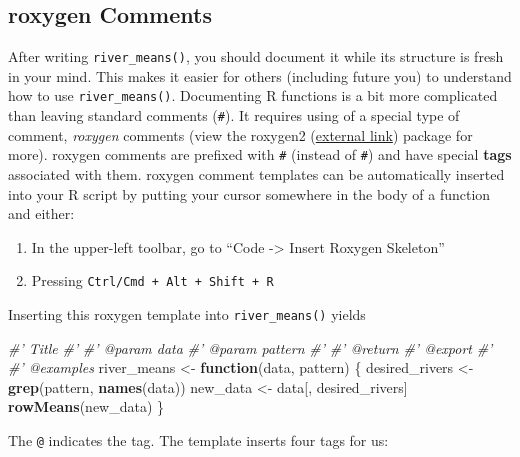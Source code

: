\documentclass[
]{book}
\newenvironment{Shaded}{\begin{snugshade}}{\end{snugshade}}
\newcommand{\CommentTok}[1]{\textcolor[rgb]{0.56,0.35,0.01}{\textit{#1}}}
\newcommand{\ControlFlowTok}[1]{\textcolor[rgb]{0.13,0.29,0.53}{\textbf{#1}}}
\newcommand{\KeywordTok}[1]{\textcolor[rgb]{0.13,0.29,0.53}{\textbf{#1}}}
\newcommand{\NormalTok}[1]{#1}
\newcommand{\StringTok}[1]{\textcolor[rgb]{0.31,0.60,0.02}{#1}}
\providecommand{\tightlist}{%
  \setlength{\itemsep}{0pt}\setlength{\parskip}{0pt}}
\begin{document}
\hypertarget{roxygen}{%
\subsection{roxygen Comments}\label{roxygen}}

After writing \texttt{river\_means()}, you should document it while its structure is fresh in your mind. This makes it easier for others (including future you) to understand how to use \texttt{river\_means()}. Documenting R functions is a bit more complicated than leaving standard comments (\texttt{\#}). It requires using of a special type of comment, \emph{roxygen} comments (view the roxygen2 (\href{https://roxygen2.r-lib.org/}{external link}) package for more). roxygen comments are prefixed with \texttt{\#\textquotesingle{}} (instead of \texttt{\#}) and have special \textbf{tags} associated with them. roxygen comment templates can be automatically inserted into your R script by putting your cursor somewhere in the body of a function and either:

\begin{enumerate}
\def\labelenumi{\arabic{enumi}.}
\tightlist
\item
  In the upper-left toolbar, go to ``Code -\textgreater{} Insert Roxygen Skeleton''
\item
  Pressing \texttt{Ctrl/Cmd\ +\ Alt\ +\ Shift\ +\ R}
\end{enumerate}

Inserting this roxygen template into \texttt{river\_means()} yields

\begin{Shaded}
\begin{Highlighting}[]
\CommentTok{#' Title}
\CommentTok{#'}
\CommentTok{#' @param data }
\CommentTok{#' @param pattern }
\CommentTok{#'}
\CommentTok{#' @return}
\CommentTok{#' @export}
\CommentTok{#'}
\CommentTok{#' @examples}
\NormalTok{river_means <-}\StringTok{ }\ControlFlowTok{function}\NormalTok{(data, pattern) \{}
\NormalTok{  desired_rivers <-}\StringTok{ }\KeywordTok{grep}\NormalTok{(pattern, }\KeywordTok{names}\NormalTok{(data))}
\NormalTok{  new_data <-}\StringTok{ }\NormalTok{data[, desired_rivers]}
  \KeywordTok{rowMeans}\NormalTok{(new_data)}
\NormalTok{\}}
\end{Highlighting}
\end{Shaded}

The \texttt{@} indicates the tag. The template inserts four tags for us:
\end{document}
